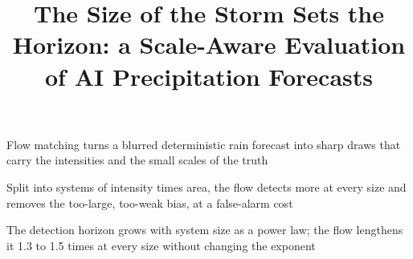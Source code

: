 \documentclass[draft]{agujournal2019}
\begin{document}
\title{The Size of the Storm Sets the Horizon: a Scale-Aware Evaluation of
AI Precipitation Forecasts}


\begin{keypoints}
\item Flow matching turns a blurred deterministic rain forecast into sharp
draws that carry the intensities and the small scales of the truth
\item Split into systems of intensity times area, the flow detects more at
every size and removes the too-large, too-weak bias, at a false-alarm cost
\item The detection horizon grows with system size as a power law; the flow
lengthens it 1.3 to 1.5 times at every size without changing the exponent
\end{keypoints}
\end{document}
